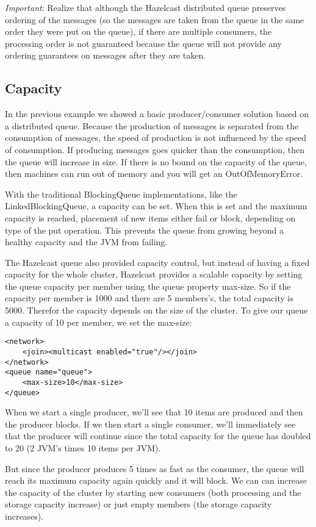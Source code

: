 \emph{Important}: Realize that although the Hazelcast distributed queue preserves ordering of the messages (so the messages are taken from the queue in the same order they were put on the queue), if there are multiple consumers, the processing order is not guaranteed because the queue will not provide any ordering guarantees on messages after they are taken.

\subsection{Capacity}
In the previous example we showed a basic producer/consumer solution based on a distributed queue. Because the production of messages is separated from the consumption of messages, the speed of production is not influenced by the speed of consumption. If producing messages goes quicker than the consumption, then the queue will increase in size. If there is no bound on the capacity of the queue, then machines can run out of memory and you will get an OutOfMemoryError. 

With the traditional BlockingQueue implementations, like the LinkedBlockingQueue, a capacity can be set. When this is set and the maximum capacity is reached, placement of new items either fail or block, depending on type of the put operation. This prevents the queue from growing beyond a healthy capacity and the JVM from failing.

The Hazelcast queue also provided capacity control, but instead of having a fixed capacity for the whole cluster, Hazelcast provides a scalable capacity by setting the queue capacity per member using the queue property max-size. So if the capacity per member is 1000 and there are 5 members's, the total capacity is 5000. Therefor the capacity depends on the size of the cluster. To give our queue a capacity of 10 per member, we set the max-size:
\begin{lstlisting}
<network>
    <join><multicast enabled="true"/></join>
</network>
<queue name="queue">
    <max-size>10</max-size>
</queue>
\end{lstlisting}
When we start a single producer, we'll see that 10 items are produced and then the producer blocks. If we then start a single consumer, we'll immediately see that the producer will continue since the total capacity for the queue has doubled to 20 (2 JVM's times 10 items per JVM). 

But since the producer produces 5 times as fast as the consumer, the queue will reach its maximum capacity again quickly and it will block. We can can increase the capacity of the cluster by starting new consumers (both processing and the storage capacity increase) or just empty members (the storage capacity increases).

